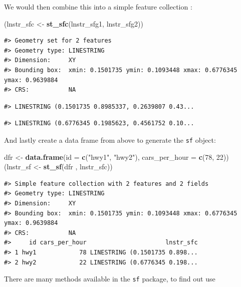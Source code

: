 \documentclass[
]{book}
\newenvironment{Shaded}{\begin{snugshade}}{\end{snugshade}}
\newcommand{\AttributeTok}[1]{\textcolor[rgb]{0.13,0.29,0.53}{#1}}
\newcommand{\DecValTok}[1]{\textcolor[rgb]{0.00,0.00,0.81}{#1}}
\newcommand{\FunctionTok}[1]{\textcolor[rgb]{0.13,0.29,0.53}{\textbf{#1}}}
\newcommand{\NormalTok}[1]{#1}
\newcommand{\OtherTok}[1]{\textcolor[rgb]{0.56,0.35,0.01}{#1}}
\newcommand{\StringTok}[1]{\textcolor[rgb]{0.31,0.60,0.02}{#1}}
\begin{document}
We would then combine this into a simple feature collection :

\begin{Shaded}
\begin{Highlighting}[]
\NormalTok{(lnstr\_sfc }\OtherTok{\textless{}{-}} \FunctionTok{st\_sfc}\NormalTok{(lnstr\_sfg1, lnstr\_sfg2)) }
\end{Highlighting}
\end{Shaded}

\begin{verbatim}
#> Geometry set for 2 features 
#> Geometry type: LINESTRING
#> Dimension:     XY
#> Bounding box:  xmin: 0.1501735 ymin: 0.1093448 xmax: 0.6776345 ymax: 0.9639884
#> CRS:           NA
\end{verbatim}

\begin{verbatim}
#> LINESTRING (0.1501735 0.8985337, 0.2639807 0.43...
\end{verbatim}

\begin{verbatim}
#> LINESTRING (0.6776345 0.1985623, 0.4561752 0.10...
\end{verbatim}

And lastly create a data frame from above to generate the \texttt{sf} object:

\begin{Shaded}
\begin{Highlighting}[]
\NormalTok{dfr }\OtherTok{\textless{}{-}} \FunctionTok{data.frame}\NormalTok{(}\AttributeTok{id =} \FunctionTok{c}\NormalTok{(}\StringTok{"hwy1"}\NormalTok{, }\StringTok{"hwy2"}\NormalTok{), }
                  \AttributeTok{cars\_per\_hour =} \FunctionTok{c}\NormalTok{(}\DecValTok{78}\NormalTok{, }\DecValTok{22}\NormalTok{))}
\NormalTok{(lnstr\_sf }\OtherTok{\textless{}{-}} \FunctionTok{st\_sf}\NormalTok{(dfr , lnstr\_sfc))}
\end{Highlighting}
\end{Shaded}

\begin{verbatim}
#> Simple feature collection with 2 features and 2 fields
#> Geometry type: LINESTRING
#> Dimension:     XY
#> Bounding box:  xmin: 0.1501735 ymin: 0.1093448 xmax: 0.6776345 ymax: 0.9639884
#> CRS:           NA
#>     id cars_per_hour                      lnstr_sfc
#> 1 hwy1            78 LINESTRING (0.1501735 0.898...
#> 2 hwy2            22 LINESTRING (0.6776345 0.198...
\end{verbatim}

There are many methods available in the \texttt{sf} package, to find out use
\end{document}
